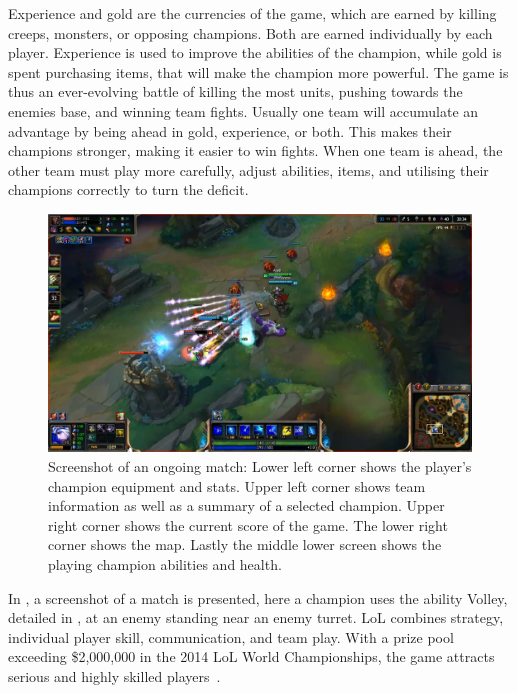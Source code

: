 Experience and gold are the currencies of the game, which are earned by killing creeps, monsters, or opposing champions. Both are earned individually by each player. Experience is used to improve the abilities of the champion, while gold is spent purchasing items, that will make the champion more powerful. The game is thus an ever-evolving battle of killing the most units, pushing towards the enemies base, and winning team fights. Usually one team will accumulate an advantage by being ahead in gold, experience, or both. This makes their champions stronger, making it easier to win fights. When one team is ahead, the other team must play more carefully, adjust abilities, items, and utilising their champions correctly to turn the deficit.

\begin{figure}[!htb]
  \centering
    \includegraphics[width=1\textwidth]{img/lolgame.png}
  \caption{Screenshot of an ongoing match: Lower left corner shows the player's champion equipment and stats. Upper left corner shows team information as well as a summary of a selected champion. Upper right corner shows the current score of the game. The lower right corner shows the map. Lastly the middle lower screen shows the playing champion abilities and health.}\label{fig:lolgame}
\end{figure}

In , a screenshot of a match is presented, here a champion uses the ability Volley, detailed in , at an enemy standing near an enemy turret. LoL combines strategy, individual player skill, communication, and team play. With a prize pool exceeding \$2,000,000 in the 2014 LoL World Championships, the game attracts serious and highly skilled players~\cite{lolprize}.